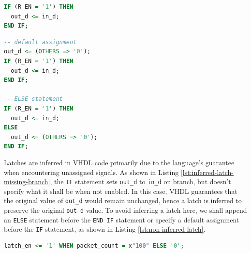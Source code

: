 \documentclass[a4paper]{report}
\newcommand{\proglang}{\textsf}
\newcommand{\code}{\texttt}
\begin{document}
\begin{minipage}{.45\textwidth}
\begin{lstlisting}[language=VHDL, caption=Inferred Latch with missing branch in \proglang{VHDL}, label={lst:inferred-latch-missing-branch}]
IF (R_EN = '1') THEN
  out_d <= in_d;
END IF;
\end{lstlisting}
\end{minipage}\hfill
\begin{minipage}{.45\textwidth}
\begin{lstlisting}[language=VHDL, caption=Inferred Latch with incomplete assignment, label={lst:non-inferred-latch}]
-- default assignment 
out_d <= (OTHERS => '0');
IF (R_EN = '1') THEN
  out_d <= in_d;
END IF;

-- ELSE statement
IF (R_EN = '1') THEN
  out_d <= in_d;
ELSE
  out_d <= (OTHERS => '0');
END IF;
\end{lstlisting}
\end{minipage}

Latches are inferred in \proglang{VHDL} code primarily due to the language's guarantee when encountering unassigned signals. As shown in Listing \ref{lst:inferred-latch-missing-branch}, the \code{IF} statement sets \code{out\_d} to \code{in\_d} on branch, but doesn't specify what it shall be when not enabled. In this case, \proglang{VHDL} guarantees that the original value of \code{out\_d} would remain unchanged, hence a latch is inferred to preserve the original \code{out\_d} value. To avoid inferring a latch here, we shall append an \code{ELSE} statement before the \code{END IF} statement or specify a default assignment before the \code{IF} statement, as shown in Listing \ref{lst:non-inferred-latch}.

\begin{lstlisting}[language=VHDL, caption=An sample latch set on packet counter reaching $\mathtt{0x100}$, label={lst:sample-latch-issue}]
latch_en <= '1' WHEN packet_count = x"100" ELSE '0';
\end{lstlisting}
\end{document}
